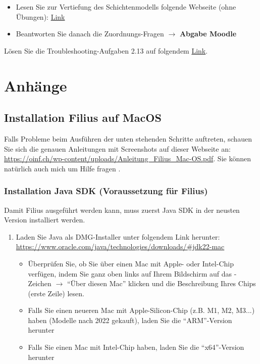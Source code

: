 \begin{mysubmission}
\begin{itemize}
\item Lesen Sie zur Vertiefung des Schichtenmodells folgende Webseite (ohne Übungen): \href{https://oinf.ch/kurs/vernetzung-und-systeme/kommunikation-in-netzwerken/}{Link}
\item Beantworten Sie danach die Zuordnungs-Fragen $\rightarrow$ \textbf{Abgabe Moodle}
\end{itemize}
\end{mysubmission}

\begin{mysubmission}
Lösen Sie die Troubleshooting-Aufgaben 2.13 auf folgendem \href{https://informatik.mygymer.ch/base/?page=network/2-filius/D-problems/}{Link}.
\end{mysubmission}



\newpage
\appendix
\section*{Anhänge}
\renewcommand{\thesubsection}{\Alph{subsection}}
\subsection{Installation Filius auf MacOS}
\begin{mycaution}
Falls Probleme beim Ausführen der unten stehenden Schritte auftreten, schauen Sie sich die genauen Anleitungen mit Screenshots auf dieser Webseite an: \url{https://oinf.ch/wp-content/uploads/Anleitung_Filius_Mac-OS.pdf}. Sie können natürlich auch mich um Hilfe fragen .
\end{mycaution}
\subsubsection{Installation Java SDK (Voraussetzung für Filius)}
Damit Filius ausgeführt werden kann, muss zuerst Java SDK in der neusten Version installiert werden.
\begin{enumerate}
\item Laden Sie Java als DMG-Installer unter folgendem Link herunter: \url{https://www.oracle.com/java/technologies/downloads/#jdk22-mac} 
\begin{itemize}
\item Überprüfen Sie, ob Sie über einen Mac mit Apple- oder Intel-Chip verfügen, indem Sie ganz oben links auf Ihrem Bildschirm auf das \faApple{}-Zeichen $\rightarrow$ ``Über diesen Mac'' klicken und die Beschreibung Ihres Chips (erste Zeile) lesen.
\item Falls Sie einen neueren Mac mit Apple-Silicon-Chip (z.B. M1, M2, M3...) haben (Modelle nach 2022 gekauft), laden Sie die ``ARM''-Version herunter
\item Falls Sie einen Mac mit Intel-Chip haben, laden Sie die ``x64''-Version herunter
\end{itemize}
\end{enumerate}

